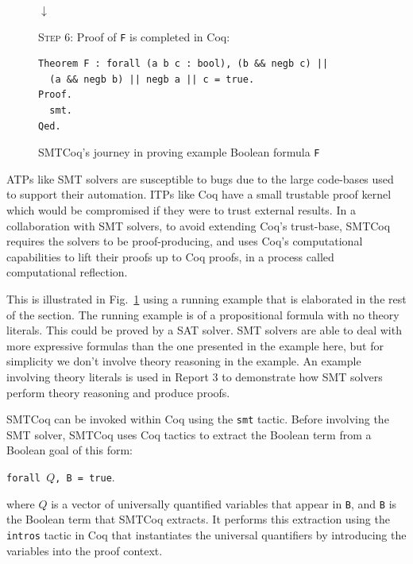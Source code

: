 \documentclass{article}
\begin{document}
\begin{figure}
		\begin{center}
			$\downarrow$
		\end{center}
		
		\begin{framed}
			\textsc{Step 6}: Proof of \texttt{F} is 
			completed in Coq:
			\begin{verbatim}
Theorem F : forall (a b c : bool), (b && negb c) || 
  (a && negb b) || negb a || c = true.
Proof.
  smt.
Qed.
			\end{verbatim}
		\end{framed}
		\caption{SMTCoq's journey in proving 
			example Boolean formula \texttt{F}}
		\label{fig:smtcoqex}
	\end{figure}
	
	ATPs like SMT solvers are susceptible 
	to bugs due to the large code-bases 
	used to support	their automation. 
	ITPs like Coq have a small trustable 
	proof kernel which would be 
	compromised if they were to trust
	external results. In a collaboration
	with SMT solvers, to avoid extending 
	Coq's trust-base, SMTCoq requires the 
	solvers to be proof-producing, and uses 
	Coq's computational capabilities 
	to lift their proofs up to Coq proofs, 
	in a process called computational 
	reflection. 
	
	This is illustrated in 
	Fig.~\ref{fig:smtcoqex} using a 
	running example that is elaborated 
	in the rest of the section. The running
	example is of a propositional formula
	with no theory literals. This could be 
	proved by a SAT solver. SMT solvers 
	are able to deal with more expressive 
	formulas than the one presented in the 
	example here, but for simplicity
	we don't involve theory reasoning
	in the example. An example involving 
	theory literals is used in Report 3 
	to demonstrate how SMT solvers 
	perform theory reasoning and produce
	proofs.
	
	SMTCoq can be invoked within Coq 
	using the \texttt{smt} tactic.
	Before involving the SMT solver, 
	SMTCoq uses Coq tactics to extract
	the Boolean term from a
	Boolean goal of this form:
	\begin{center}
		\texttt{forall $Q$, \texttt{B} = true}.
	\end{center}
	where $Q$ is a vector of universally 
	quantified variables that appear in 
	\texttt{B}, and \texttt{B} is the Boolean
	term that SMTCoq extracts. It performs 
	this extraction using the \texttt{intros}
	tactic in Coq that instantiates the 
	universal quantifiers by introducing 
	the variables into the proof context.
	
\end{document}

